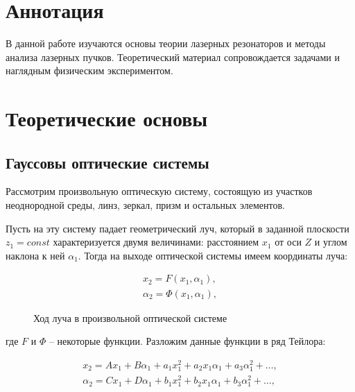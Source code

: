 \documentclass[a4paper,12pt]{article}
\begin{document}
\tableofcontents

\newpage

\section{Аннотация}
В данной работе изучаются основы теории лазерных резонаторов и методы анализа лазерных пучков. Теоретический материал сопровождается задачами и наглядным физическим экспериментом. 
\section{Теоретические основы}

\subsection{Гауссовы оптические системы}

Рассмотрим произвольную оптическую систему, состоящую из участков неоднородной среды, линз, зеркал, призм и остальных элементов.

Пусть на эту систему падает геометрический луч, который в заданной плоскости $z_1 = const$ характеризуется двумя величинами: расстоянием $x_1$ от оси $Z$ и углом наклона к ней $\alpha_1$. Тогда на выходе оптической системы имеем координаты луча:

\begin{equation}
\begin{split}
    x_2 = F(x_1, \alpha_1),\\
    \alpha_2 = \Phi(x_1, \alpha_1),
\end{split}
\end{equation}

\begin{figure}[h!]
    \caption{Ход луча в произвольной оптической системе}
    \label{fig:abcd}
\end{figure}

где $F$ и $\Phi$ -- некоторые функции. Разложим данные функции в ряд Тейлора:

\begin{equation}
\begin{split}
    x_2 = Ax_1 + B\alpha_1 + a_1 x_1^2 + a_2 x_1 \alpha_1 + a_3 \alpha_1^2 + \dots,\\
    \alpha_2 = Cx_1 + D\alpha_1 + b_1 x_1^2 + b_2 x_1 \alpha_1 + b_3 \alpha_1^2 + \dots,
\end{split}
\label{dissolve}
\end{equation}
\end{document}
